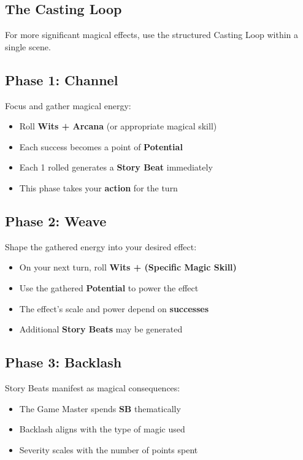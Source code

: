 \begin{multicols}{2}
\section{The Casting Loop} 

For more significant magical effects, use the structured Casting Loop within a single scene.

\subsection*{Phase 1: Channel} 
Focus and gather magical energy:
\begin{itemize}
\item Roll \textbf{Wits + Arcana} (or appropriate magical skill)
\item Each success becomes a point of \textbf{Potential}
\item Each 1 rolled generates a \textbf{Story Beat} immediately
\item This phase takes your \textbf{action} for the turn
\end{itemize}

\subsection*{Phase 2: Weave} 
Shape the gathered energy into your desired effect:
\begin{itemize}
\item On your next turn, roll \textbf{Wits + (Specific Magic Skill)}
\item Use the gathered \textbf{Potential} to power the effect
\item The effect's scale and power depend on \textbf{successes}
\item Additional \textbf{Story Beats} may be generated
\end{itemize}

\subsection*{Phase 3: Backlash} 
Story Beats manifest as magical consequences:
\begin{itemize}
\item The Game Master spends \textbf{SB} thematically
\item Backlash aligns with the type of magic used
\item Severity scales with the number of points spent
\end{itemize}


\end{multicols}
